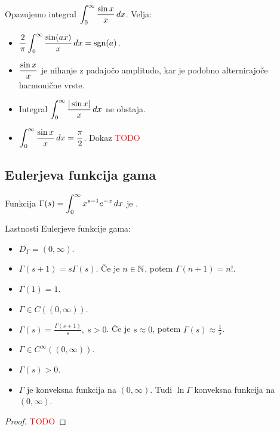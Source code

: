 \begin{zgled}
   Opazujemo integral \(\displaystyle \int_{0}^{\infty} \frac{\sin x}{x} \, dx\). Velja:
   \begin{itemize}
    \item \(\displaystyle \frac{2}{\pi} \int_{0}^{\infty} \frac{\sin (ax)}{x} \, dx = \operatorname{sgn} (a)\).
    \item \(\displaystyle \frac{\sin x}{x}\) je nihanje z padajočo amplitudo, kar je podobno alternirajoče harmonične vrste.
    \item Integral \(\displaystyle \int_{0}^{\infty} \frac{|\sin x|}{x} \, dx\) ne obstaja.
    \item \(\displaystyle \int_{0}^{\infty} \frac{\sin x}{x} \, dx = \frac{\pi}{2}\). Dokaz \textcolor{red}{TODO}
   \end{itemize}
\end{zgled}

\newpage
\subsection{Eulerjeva funkcija gama}
\begin{definicija}
    Funkcija $\displaystyle \Gamma (s) = \int_{0}^{\infty} x^{s-1}e^{-x} \, dx$ je .
\end{definicija}

\begin{trditev}
    Lastnosti Eulerjeve funkcije gama:
    \begin{itemize}
        \item $D_\Gamma = (0, \infty)$.
        \item \(\Gamma(s+1) = s \Gamma(s)\). Če je \(n \in \mathbb{N}\), potem \(\Gamma(n+1) = n!\).
        \item \(\Gamma(1) = 1\).
        \item \(\Gamma  \in C((0, \infty))\).
        \item \(\Gamma (s) = \frac{\Gamma (s+1)}{s}, \ s > 0\). Če je \(s \approx 0\), potem \(\Gamma(s) \approx \frac{1}{s}\).
        \item \(\Gamma \in C^\infty ((0, \infty))\).
        \item \(\Gamma(s)>0\).
        \item \(\Gamma\) je konveksna funkcija na \((0, \infty)\). Tudi \(\ln \Gamma\) konveksna funkcija na \((0, \infty)\).
    \end{itemize}
\end{trditev}

\begin{proof}
    \textcolor{red}{TODO}
\end{proof}

